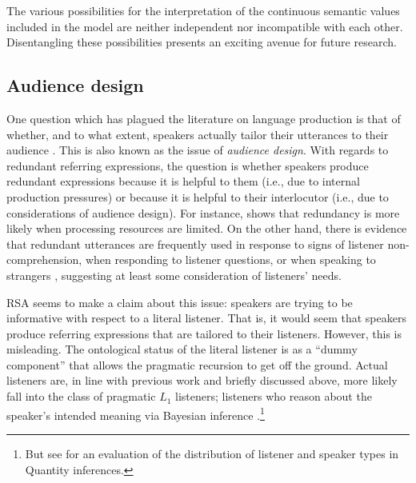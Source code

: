 \documentclass[11pt]{article}
\begin{document}
The various possibilities for the interpretation of the continuous semantic values included in the model are neither independent nor incompatible with each other. Disentangling these possibilities presents an exciting avenue for future research.




\subsection{Audience design}

One question which has plagued the literature on language production is that of whether, and to what extent, speakers actually tailor their utterances to their audience \cite{Clark1982, horton1996, Brown-schmidt2014}. This is also known as the issue of \emph{audience design}. With regards to redundant referring expressions, the question is whether speakers produce redundant expressions because it is helpful to them (i.e., due to internal production pressures) or  because it is helpful to their interlocutor (i.e., due to considerations of audience design). For instance,  shows that redundancy is more likely when processing resources are limited. On the other hand, there is evidence that redundant  utterances are frequently used in response to signs of
listener non-comprehension, when responding to listener questions, or when speaking to
strangers \cite{Baker2008}, suggesting at least some consideration of listeners' needs.

RSA seems to make a claim about this issue: speakers are trying to be informative with respect to a literal listener. That is, it would seem that speakers produce referring expressions that are tailored to their listeners. However, this is misleading. The ontological status of the literal listener is as a ``dummy component'' that allows the pragmatic recursion to get off the ground. Actual listeners are, in line with previous work and briefly discussed above, more likely fall into the class of pragmatic $L_1$ listeners; listeners who reason about the speaker's intended meaning via Bayesian inference \cite{frank2012, goodmanstuhlmueller2013}.\footnote{But see  for an evaluation of the distribution of listener and speaker types in Quantity inferences.}
\end{document}
